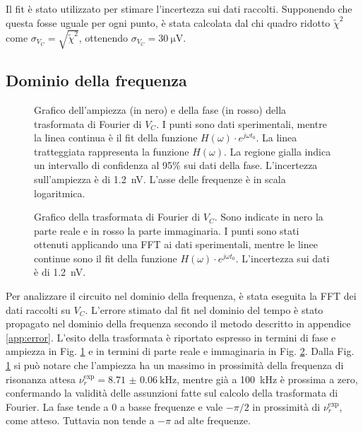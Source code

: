 \documentclass[12pt,a4paper, twocolumn]{article}
\begin{document}
Il fit è stato utilizzato per stimare l'incertezza sui dati raccolti. Supponendo che questa fosse uguale per ogni punto, è stata calcolata dal chi quadro ridotto $\tilde{\chi}^2$ come $\sigma_{V_C} = \sqrt{\tilde{\chi}^2}$, ottenendo $\sigma_{V_C} = \SI{30}{\micro\volt}$.

\subsection{Dominio della frequenza}
\begin{figure}[t]

\caption{Grafico dell'ampiezza (in nero) e della fase (in rosso) della trasformata di Fourier di $V_C$. I punti sono dati sperimentali, mentre la linea continua è il fit della funzione $H(\omega) \cdot e^{j\omega t_0}$. La linea tratteggiata rappresenta la funzione $H(\omega)$. La regione gialla indica un intervallo di confidenza al 95\% sui dati della fase. L'incertezza sull'ampiezza è di \SI{1.2}{\nano\volt}. L'asse delle frequenze è in scala logaritmica.}
\label{fig:plot-freqs}
\end{figure}

\begin{figure}[t]

\caption{Grafico della trasformata di Fourier di $V_C$. Sono indicate in nero la parte reale e in rosso la parte immaginaria. I punti sono stati ottenuti applicando una FFT ai dati sperimentali, mentre le linee continue sono il fit della funzione $H(\omega) \cdot e^{j\omega t_0}$. L'incertezza sui dati è di \SI{1.2}{\nano\volt}.}
\label{fig:plot-realimag}
\end{figure}

Per analizzare il circuito nel dominio della frequenza, è stata eseguita la FFT dei dati raccolti su $V_C$. L'errore stimato dal fit nel dominio del tempo è stato propagato nel dominio della frequenza secondo il metodo descritto in appendice \ref{app:error}. L'esito della trasformata è riportato espresso in termini di fase e ampiezza in Fig. \ref{fig:plot-freqs} e in termini di parte reale e immaginaria in Fig. \ref{fig:plot-realimag}. Dalla Fig. \ref{fig:plot-freqs} si può notare che l'ampiezza ha un massimo in prossimità della frequenza di risonanza attesa $\nu_r^\text{exp} = \SI{8.71(6)}{\kilo\hertz}$, mentre già a \SI{100}{\kilo\hertz} è prossima a zero, confermando la validità delle assunzioni fatte sul calcolo della trasformata di Fourier. La fase tende a 0 a basse frequenze e vale $-\pi/2$ in prossimità di $\nu_r^\text{exp}$, come atteso. Tuttavia non tende a $-\pi$ ad alte frequenze.
\end{document}
